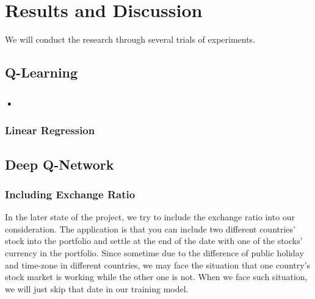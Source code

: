 \chapter{Results and Discussion}
\label{Ch:Result and Discussion}
We will conduct the research through several trials of experiments. 

\section{Q-Learning}

\subsection{•}

\subsection{Linear Regression}

\section{Deep Q-Network}

\subsection{Including Exchange Ratio}
In the later state of the project, we try to include the exchange ratio into our consideration. The application is that you can include two different countries' stock into the portfolio and settle at the end of the date with one of the stocks' currency in the portfolio. Since sometime due to the difference of public holiday and time-zone in different countries, we may face the situation that one country's stock market is working while the other one is not. When we face such situation, we will just skip that date in our training model.

\endinput
